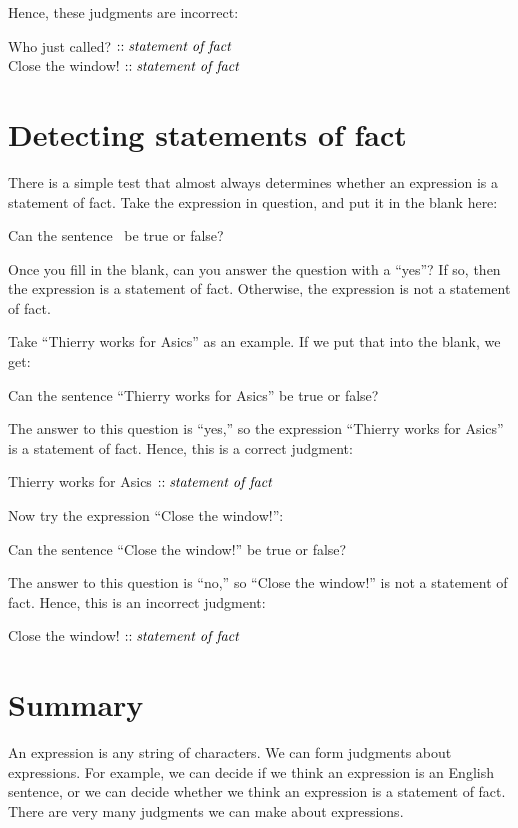 \documentclass[../../../main.tex]{subfiles}
\begin{document}
\noindent
Hence, these judgments are incorrect:

\begin{center}
  Who just called? $:: \text{\emph{statement~of~fact}}$ \\
  Close the window! $:: \text{\emph{statement~of~fact}}$
\end{center}


\section{Detecting statements of fact}

There is a simple test that almost always determines whether an expression is a statement of fact. Take the expression in question, and put it in the blank here:

\begin{center}
  Can the sentence \blank~be true or false?
\end{center}

\noindent
Once you fill in the blank, can you answer the question with a ``yes''? If so, then the expression is a statement of fact. Otherwise, the expression is not a statement of fact.

Take ``Thierry works for Asics'' as an example. If we put that into the blank, we get:

\begin{center}
  Can the sentence ``Thierry works for Asics'' be true or false?
\end{center}

\noindent
The answer to this question is ``yes,'' so the expression ``Thierry works for Asics'' is a statement of fact. Hence, this is a correct judgment:

\begin{center}
  Thierry works for Asics $:: \text{\emph{statement~of~fact}}$
\end{center}

\noindent
Now try the expression ``Close the window!'':

\begin{center}
  Can the sentence ``Close the window!'' be true or false?
\end{center}

\noindent
The answer to this question is ``no,'' so ``Close the window!'' is not a statement of fact. Hence, this is an incorrect judgment:

\begin{center}
  Close the window! $:: \text{\emph{statement~of~fact}}$
\end{center}


\section{Summary}

An expression is any string of characters. We can form judgments about expressions. For example, we can decide if we think an expression is an English sentence, or we can decide whether we think an expression is a statement of fact. There are very many judgments we can make about expressions.
\end{document}
